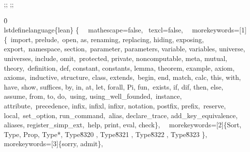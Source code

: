 {\ansi{}
{;;}
{\*\expandedcolortbl;;}
\pard{}\pardirnatural{}

\f0  %
\
\\lstdefinelanguage\{lean\} \{\
\
mathescape=false,\
texcl=false,\
\
morekeywords=[1]\{\
import, prelude,\
open, as, renaming, replacing, hiding, exposing, export,\
namespace, section,\
parameter, parameters, variable, variables, universe, universes, include, omit,\
protected, private, noncomputable, meta, mutual, theory,\
definition, def, constant, constants, lemma, theorem, example, axiom, axioms,\
inductive, structure, class, extends,\
begin, end, match, calc, this, with, have, show, suffices, by, in, at, let, forall, Pi, fun,\
exists, if, dif, then, else, assume, from, to, do,\
using, using_well_founded,\
instance, attribute,\
precedence, infix, infixl, infixr, notation, postfix, prefix,\
reserve, local,\
set_option, run_command,\
alias, declare_trace, add_key_equivalence, aliases, register_simp_ext,\
help, print, eval, check\},\
\
morekeywords=[2]\{Sort, Type, Prop, Type*, Type\u8320 , Type\u8321 , Type\u8322 , Type\u8323 \},\
\
morekeywords=[3]\{sorry, admit\},\
\
}
